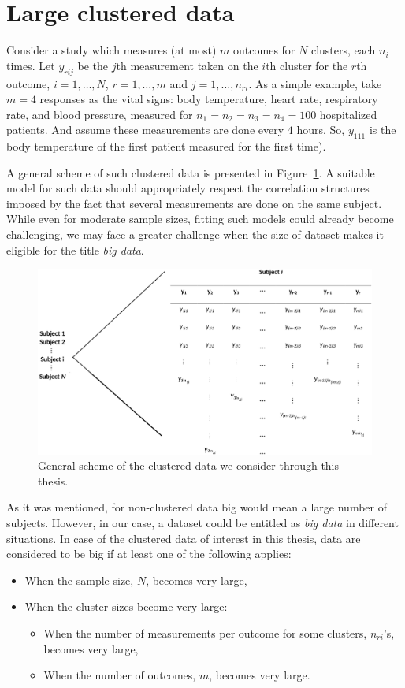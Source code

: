 \documentclass[11pt,a5paper,twoside]{book}
\begin{document}
\section{Large clustered data}

Consider a study which measures (at most) $m$ outcomes for $N$ clusters, each $n_i$ times. Let $y_{rij}$ be the $j$th measurement taken on the $i$th cluster for the $r$th outcome, $i=1,\ldots,N$, $r=1,\ldots,m$ and $j=1,\ldots,n_{ri}$. As a simple example, take $m=4$ responses as the vital signs: body temperature, heart rate, respiratory rate, and blood pressure, measured for $n_1 = n_2 = n_3 = n_4 = 100$ hospitalized patients. And assume these measurements are done every $4$ hours. So, $y_{111}$ is the body temperature of the first patient measured for the first time). 

A general scheme of such clustered data is presented in Figure~\ref{fig_scheme}. A suitable model for such data should appropriately respect the correlation structures imposed by the fact that several measurements are done on the same subject. While even for moderate sample sizes, fitting such models could already become challenging, we may face a greater challenge when the size of dataset makes it eligible for the title \emph{big data}. 

\begin{figure}
\centering
\includegraphics[width=\textwidth]{scheme_new.eps}
\caption{General scheme of the clustered data we consider through this thesis.} 
\label{fig_scheme}
\end{figure} 


As it was mentioned, for non-clustered data big would mean a large number of subjects. However, in our case, a dataset could be entitled as \emph{big data} in different situations. In case of the clustered data of interest in this thesis, data are considered to be big if at least one of the following applies:
\begin{itemize}
\item When the sample size, $N$, becomes very large,
\item When the cluster sizes become very large:
\begin{itemize}
\item When the number of measurements per outcome for some clusters, $n_{ri}$'s, becomes very large,
\item When the number of outcomes, $m$, becomes very large.
\end{itemize}
\end{itemize}
\end{document}
